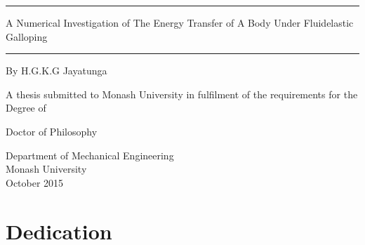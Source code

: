 \documentclass[11pt,titlepage,twoside,a4paper]{report}
\newcommand{\myclearpage}{\thispagestyle{empty}\cleartoevenpage\thispagestyle{empty}\cleartooddpage}
\begin{document}
\begin{titlepage}
\noindent\rule{\textwidth}{1.5pt}
\begin{flushright}
\LARGE
{\sc A Numerical Investigation of The Energy Transfer of A Body Under Fluidelastic Galloping} \\

\noindent\rule{\textwidth}{1.5pt}

\LARGE
\vspace{30mm}
{\sc By H.G.K.G Jayatunga}
\vspace{30mm}

\normalsize
{\sc A thesis submitted to Monash University in fulfilment of the requirements for the Degree of}

\vspace{5mm}
\LARGE
{\sc Doctor of Philosophy}

\vspace{15mm}
\normalsize
Department of Mechanical Engineering\\
Monash University\\
October 2015
\end{flushright}

\end{titlepage}

\myclearpage

%
%

\chapter*{Dedication}
	
	\par{}




\myclearpage
\tableofcontents
\newpage
\myclearpage
{}








\myclearpage



\end{document}
